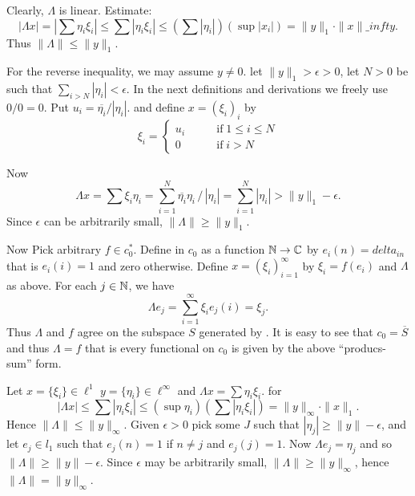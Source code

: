 \begin{enumerate}
\begin{itemize}
Clearly, \(\Lambda\) is linear.
Estimate:
\[ |\Lambda x| 
   = \left|\sum \eta_i\xi_i\right|
   \leq \sum |\eta_i \xi_i|
   \leq \left(\sum |\eta_i|\right) \left(\sup |x_i|\right) 
   = \|y\|_1 \cdot \|x\|\_infty.\]
Thus \(\|\Lambda\| \leq \|y\|_1\). 

For the reverse inequality, we may assume \(y\neq 0\).
let \(\|y\|_1 > \epsilon>0\),
let \(N>0\) be such that \(\sum_{i>N} |\eta_i| < \epsilon\).
In the next definitions and derivations we freely use \(0/0 = 0\).
Put \(u_i = \overline{\eta_i}/|\eta_i|\).
and define \(x=(\xi_i)_i\) by 
\[
   \xi_i = \left\{\begin{array}{ll}
                   u_i   & \qquad \textrm{if}\;  1\leq i\leq N \\
                   0     & \qquad \textrm{if}\;  i> N
                  \end{array}\right.\]

Now 
\[\Lambda x 
 = \sum \xi_i\eta_i
 = \sum_{i=1}^N \overline{\eta_i}\eta_i \,/\, |\eta_i|
 = \sum_{i=1}^N |\eta_i|
 > \|y\|_1 - \epsilon.\]
Since \(\epsilon\) can be arbitrarily small, \(\|\Lambda\|\geq \|y\|_1\).

Now Pick arbitrary \(f\in c_0^*\). 
Define  in \(c_0\) as a function \(\mathbb{N}\to \mathbb{C}\)
by \(e_i(n) = delta_{in}\) that is \(e_i(i)=1\) and zero otherwise.
Define \(x=(\xi_i)_{i=1}^\infty\) by \(\xi_i = f(e_i)\)
and \(\Lambda\) as above. 
For each \(j\in \mathbb{N}\), we have
\[\Lambda e_j = \sum_{i=1}^\infty \xi_i e_j(i) = \xi_j.\]
Thus \(\Lambda\) and $f$ agree on the subspace $S$ generated by .
It is easy to see that \(c_0 = \overline{S}\) and thus \(\Lambda = f\)
that is every functional on \(c_0\) is given by the above ``producs-sum'' form.

 Let \(x=\{\xi_i\}\in \ell^1\) 
 \(y=\{\eta_i\}\in \ell^\infty\) and \(\Lambda x = \sum \eta_i\xi_i\).
 for 
 \[ |\Lambda x| \leq \sum |\eta_i\xi_i| 
    \leq \left(\sup \eta_i\right)\left( \sum |\eta_i\xi_i| \right)
    = \|y\|_\infty \cdot \|x\|_1.\]
 Hence \(\|\Lambda\| \leq \|y\|_\infty\).
 Given \(\epsilon>0\) pick some $J$ such that \(|\eta_j| \geq \|y\|-\epsilon\),
 and let \(e_j\in l_1\) 
 such that \(e_j(n) = 1\) if \(n\neq j\) and \(e_j(j)=1\).
 Now \(\Lambda e_j = \eta_j\) and so \(\|\Lambda\| \geq \|y\|-\epsilon\).
 Since \(\epsilon\) may be arbitrarily small, \(\|\Lambda\| \geq \|y\|_\infty\),
 hence \(\|\Lambda\| = \|y\|_\infty\).


\end{itemize}
\end{enumerate}

